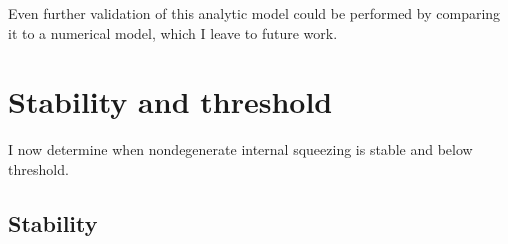 Even further validation of this analytic model could be performed by comparing it to a numerical model, which I leave to future work.


\section{Stability and threshold}
\label{sec:stability_and_threshold}

I now determine when nondegenerate internal squeezing is stable and below threshold. %

\subsection{Stability}
\label{sec:nIS_stability}

